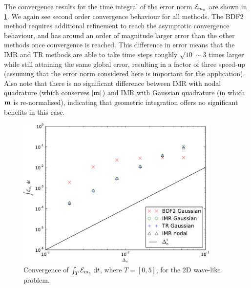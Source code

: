 The convergence results for the time integral of the error norm $\mathcal{E}_{m_z}$ are shown in \cref{fig:convergence-long-time-mz-norm}.
We again see second order convergence behaviour for all methods.
The BDF2 method requires additional refinement to reach the asymptotic convergence behaviour, and has around an order of magnitude larger error than the other methods once convergence is reached.
\label{cpu-correction-1}
This difference in error means that the IMR and TR methods are able to take time steps roughly $\sqrt{10} \sim 3$ times larger while still attaining the same global error, resulting in a factor of three speed-up (assuming that the error norm considered here is important for the application).
Also note that there is no significant difference between IMR with nodal quadrature (which conserves $\left|{\boldsymbol{\mathrm{m}}} \right|$) and IMR with Gaussian quadrature (in which $\boldsymbol{\mathrm{m}}$ is re-normalised), indicating that geometric integration offers no significant benefits in this case.
\begin{figure}
  \centering
  \includegraphics[width=0.9\textwidth]{plots/2d_wave_solution_convergence_long_time/auxerr1integralvsfakemeanofdts.pdf}
  \caption{Convergence of ${\int_T {\mathcal{E}_{m_z}} {\; \mathrm{{d}}} t}$, where $T=[0,5]$, for the 2D wave-like problem.
  }
  \label{fig:convergence-long-time-mz-norm}
\end{figure}

